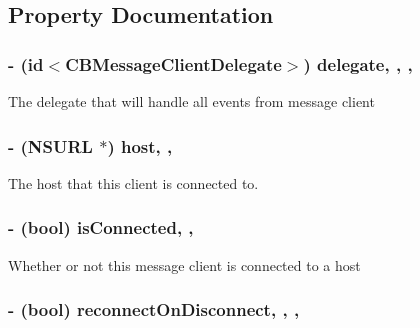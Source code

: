 \subsection{Property Documentation}
\hypertarget{interface_c_b_message_client_a6a94ee89f64cbc4bef855ecdda6fbf85}{
\subsubsection[{delegate}]{\setlength{\rightskip}{0pt plus 5cm}-\/ (id$<${\bf C\+B\+Message\+Client\+Delegate}$>$) delegate\hspace{0.3cm}{\ttfamily [read]}, {\ttfamily [write]}, {\ttfamily [atomic]}, {\ttfamily [weak]}}}\label{interface_c_b_message_client_a6a94ee89f64cbc4bef855ecdda6fbf85}
The delegate that will handle all events from message client \hypertarget{interface_c_b_message_client_a770ff8d5b798d220ecc7bc00804112d4}{
\subsubsection[{host}]{\setlength{\rightskip}{0pt plus 5cm}-\/ (N\+S\+U\+R\+L $\ast$) host\hspace{0.3cm}{\ttfamily [read]}, {\ttfamily [atomic]}, {\ttfamily [assign]}}}\label{interface_c_b_message_client_a770ff8d5b798d220ecc7bc00804112d4}
The host that this client is connected to. \hypertarget{interface_c_b_message_client_a6a385330b831471122ffb52b101422fb}{
\subsubsection[{is\+Connected}]{\setlength{\rightskip}{0pt plus 5cm}-\/ (bool) is\+Connected\hspace{0.3cm}{\ttfamily [read]}, {\ttfamily [atomic]}, {\ttfamily [assign]}}}\label{interface_c_b_message_client_a6a385330b831471122ffb52b101422fb}
Whether or not this message client is connected to a host \hypertarget{interface_c_b_message_client_ab7081a5e525a5b45420b1e44e23a90a4}{
\subsubsection[{reconnect\+On\+Disconnect}]{\setlength{\rightskip}{0pt plus 5cm}-\/ (bool) reconnect\+On\+Disconnect\hspace{0.3cm}{\ttfamily [read]}, {\ttfamily [write]}, {\ttfamily [nonatomic]}, {\ttfamily [assign]}}}\label{interface_c_b_message_client_ab7081a5e525a5b45420b1e44e23a90a4}
